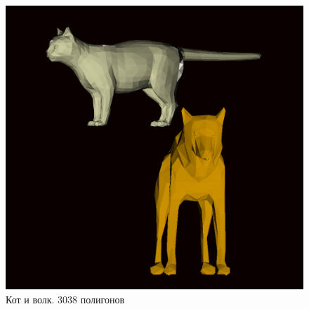 \begin{figure}[H]
	\begin{center}
		\includegraphics[scale=0.45]{images/catwolf}
	\end{center}
	\captionsetup{justification=centering}
	\caption{Кот и волк. 3038 полигонов}
	\label{img:s1}
\end{figure}

